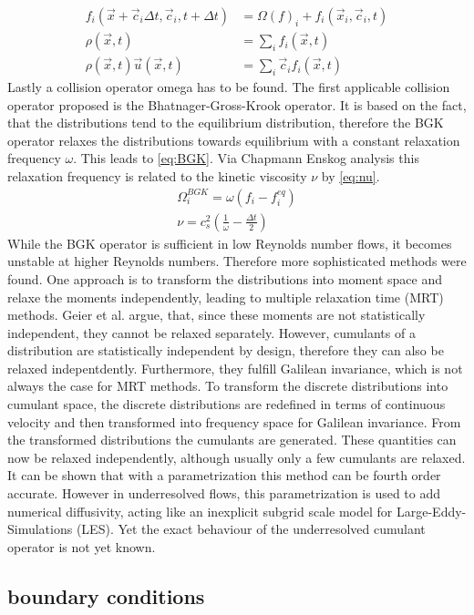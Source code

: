\begin{align}
	f_i(\vec{x} + \vec{c}_i \Delta t, \vec{c}_i, t+\Delta t ) &= \Omega(f)_i + f_i(\vec{x}_i, \vec{c}_i, t) \label{eq:LBE} \\
	\rho(\vec{x}, t) &= \sum_i f_i(\vec{x}, t) \label{eq:density_d} \\
	\rho(\vec{x}, t) \vec{u}(\vec{x}, t) &= \sum_i \vec{c}_i f_i(\vec{x}, t) \label{eq:vel_d}
\end{align}
Lastly a collision operator omega has to be found. The first applicable collision operator proposed is the Bhatnager-Gross-Krook operator. It is based on the fact, that the distributions tend to the equilibrium distribution, therefore the BGK operator relaxes the distributions towards equilibrium with a constant relaxation frequency $\omega$. This leads to \eqref{eq:BGK}. Via Chapmann Enskog analysis this relaxation frequency is related to the kinetic viscosity $\nu$ by \eqref{eq:nu}. \cite[p. 98-100, 112]{kruger_lattice_2017}
\begin{align}
	\Omega^{BGK}_i = \omega\left(f_i - f_i^{eq} \right) \label{eq:BGK} \\
	\nu = c_s^2\left(\frac{1}{\omega} - \frac{\Delta t }{2} \right) \label{eq:nu}
\end{align}
While the BGK operator is sufficient in low Reynolds number flows, it becomes unstable at higher Reynolds numbers. Therefore more sophisticated methods were found. One approach is to transform the distributions into moment space and relaxe the moments independently, leading to multiple relaxation time (MRT) methods. Geier et al. argue, that, since these moments are not statistically independent, they cannot be relaxed separately. However, cumulants of a distribution are statistically independent by design, therefore they can also be relaxed indepentdently. Furthermore, they fulfill Galilean invariance, which is not always the case for MRT methods. To transform the discrete distributions into cumulant space, the discrete distributions are redefined in terms of continuous velocity and then transformed into frequency space for Galilean invariance. From the transformed distributions the cumulants are generated. These quantities can now be relaxed independently, although usually only a few cumulants are relaxed. It can be shown that with a parametrization this method can be fourth order accurate. However in underresolved flows, this parametrization is used to add numerical diffusivity, acting like an inexplicit subgrid scale model for Large-Eddy-Simulations (LES). Yet the exact behaviour of the underresolved cumulant operator is not yet known. 
\subsection{boundary conditions}